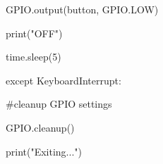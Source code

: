 \documentclass[onecolumn, draftclsnofoot,10pt, compsoc]{IEEEtran}
\begin{document}
				\begin{flushleft}
				\quad \quad GPIO.output(button, GPIO.LOW)
				\end{flushleft}
				\begin{flushleft}
				\quad \quad print("OFF")
				\end{flushleft}
				\begin{flushleft}
				\quad \quad time.sleep(5)
				\end{flushleft}
\begin{flushleft}
except KeyboardInterrupt:
\end{flushleft}
	\begin{flushleft}
		\begin{flushleft}
		\quad \#cleanup GPIO settings
		\end{flushleft}
		\begin{flushleft}
		\quad GPIO.cleanup()
		\end{flushleft}
		\begin{flushleft}
		\quad print("Exiting...")
	\end{flushleft}



		\end{flushleft}


\newpage
\end{document}
